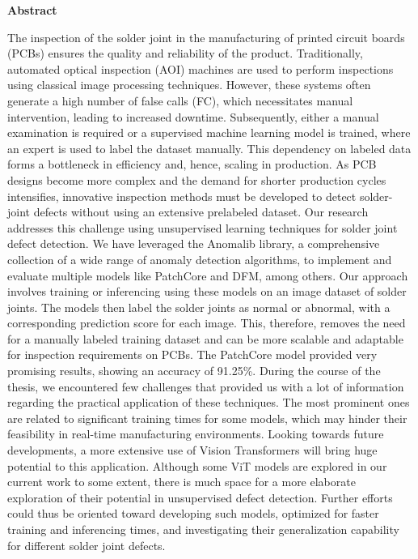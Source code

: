 
\begin{center}
\bfseries
{Abstract}
\normalfont
\end{center}
\sloppy
The inspection of the solder joint in the manufacturing of printed circuit boards (PCBs) ensures the quality and reliability of the product. Traditionally, automated optical inspection (AOI) machines are used to perform inspections using classical image processing techniques. However, these systems often generate a high number of false calls (FC), which necessitates manual intervention, leading to increased downtime. Subsequently, either a manual examination is required or a supervised machine learning model is trained, where an expert is used to label the dataset manually. This dependency on labeled data forms a bottleneck in efficiency and, hence, scaling in production. As PCB designs become more complex and the demand for shorter production cycles intensifies, innovative inspection methods must be developed to detect solder-joint defects without using an extensive prelabeled dataset.
Our research addresses this challenge using unsupervised learning techniques for solder joint defect detection. We have leveraged the Anomalib library, a comprehensive collection of a wide range of anomaly detection algorithms, to implement and evaluate multiple models like PatchCore and DFM, among others. Our approach involves training or inferencing using these models on an image dataset of solder joints. The models then label the solder joints as normal or abnormal, with a corresponding prediction score for each image. This, therefore, removes the need for a manually labeled training dataset and can be more scalable and adaptable for inspection requirements on PCBs. The PatchCore model provided very promising results, showing an accuracy of 91.25\%.
During the course of the thesis, we encountered few challenges that provided us with a lot of information regarding the practical application of these techniques. The most prominent ones are related to significant training times for some models, which may hinder their feasibility in real-time manufacturing environments. Looking towards future developments, a more extensive use of Vision Transformers will bring huge potential to this application. Although some ViT models are explored in our current work to some extent, there is much space for a more elaborate exploration of their potential in unsupervised defect detection. Further efforts could thus be oriented toward developing such models, optimized for faster training and inferencing times, and investigating their generalization capability for different solder joint defects.